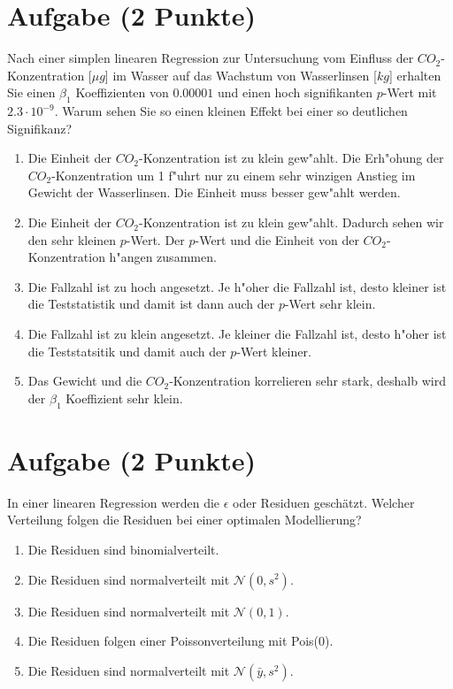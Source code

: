 \documentclass[a4paper, 9pt]{scrartcl}\usepackage[]{graphicx}\usepackage[]{xcolor}
\begin{document}
\section{Aufgabe \hfill (2 Punkte)}

Nach einer simplen linearen Regression zur Untersuchung vom Einfluss der
$CO_2$-Konzentration [$\mu g$] im Wasser auf das Wachstum von Wasserlinsen
[$kg$] erhalten Sie einen $\beta_1$ Koeffizienten von $0.00001$ und einen
hoch signifikanten $p$-Wert mit $2.3\cdot 10^{-9}$. Warum sehen Sie so einen kleinen
Effekt bei einer so deutlichen Signifikanz? 




\begin{enumerate}
\item [\textbf{A} \msquare] Die Einheit der $CO_2$-Konzentration ist zu klein gew{"a}hlt. Die Erh{"o}hung der $CO_2$-Konzentration um 1 f{"u}hrt nur zu einem sehr winzigen Anstieg im Gewicht der Wasserlinsen. Die Einheit muss besser gew{"a}hlt werden.
\item [\textbf{B} \msquare] Die Einheit der $CO_2$-Konzentration ist zu klein gew{"a}hlt. Dadurch sehen wir den sehr kleinen $p$-Wert. Der $p$-Wert und die Einheit von der $CO_2$-Konzentration h{"a}ngen zusammen.
\item [\textbf{C} \msquare] Die Fallzahl ist zu hoch angesetzt. Je h{"o}her die Fallzahl ist, desto kleiner ist die Teststatistik und damit ist dann auch der $p$-Wert sehr klein.
\item [\textbf{D} \msquare] Die Fallzahl ist zu klein angesetzt. Je kleiner die Fallzahl ist, desto h{"o}her ist die Teststatsitik und damit auch der $p$-Wert kleiner. 
\item [\textbf{E} \msquare] Das Gewicht und die $CO_2$-Konzentration korrelieren sehr stark, deshalb wird der $\beta_1$ Koeffizient sehr klein.
\end{enumerate}

\section{Aufgabe \hfill (2 Punkte)}

In einer linearen Regression werden die $\epsilon$ oder Residuen
gesch{\"a}tzt. Welcher Verteilung folgen die Residuen bei einer optimalen
Modellierung? 



\begin{enumerate}
\item [\textbf{A} \msquare] Die Residuen sind binomialverteilt.
\item [\textbf{B} \msquare] Die Residuen sind normalverteilt mit $\mathcal{N}(0, s^2)$.
\item [\textbf{C} \msquare] Die Residuen sind normalverteilt mit $\mathcal{N}(0, 1)$.
\item [\textbf{D} \msquare] Die Residuen folgen einer Poissonverteilung mit Pois(0).
\item [\textbf{E} \msquare] Die Residuen sind normalverteilt mit $\mathcal{N}(\bar{y}, s^2)$.
\end{enumerate}
\end{document}
